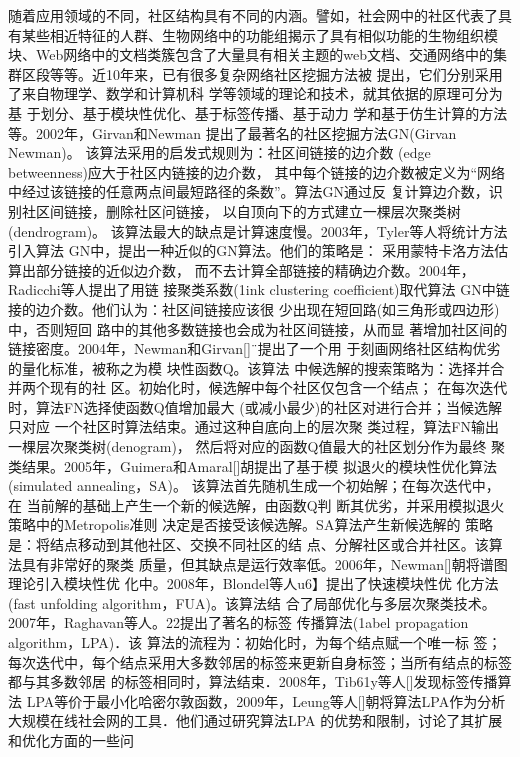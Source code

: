 随着应用领域的不同，社区结构具有不同的内涵。譬如，社会网中的社区代表了具有某些相近特征的人群、生物网络中的功能组揭示了具有相似功能的生物组织模块、Web网络中的文档类簇包含了大量具有相关主题的web文档、交通网络中的集群区段等等。近10年来，已有很多复杂网络社区挖掘方法被
提出，它们分别采用了来自物理学、数学和计算机科
学等领域的理论和技术，就其依据的原理可分为基
于划分、基于模块性优化、基于标签传播、基于动力
学和基于仿生计算的方法等。2002年，Girvan和Newman
提出了最著名的社区挖掘方法GN(Girvan Newman)。
该算法采用的启发式规则为：社区间链接的边介数
(edge betweenness)应大于社区内链接的边介数，
其中每个链接的边介数被定义为“网络中经过该链接的任意两点间最短路径的条数”。算法GN通过反
复计算边介数，识别社区间链接，删除社区问链接，
以自顶向下的方式建立一棵层次聚类树(dendrogram)。
该算法最大的缺点是计算速度慢。2003年，Tyler等人将统计方法引入算法
GN中，提出一种近似的GN算法。他们的策略是：
采用蒙特卡洛方法估算出部分链接的近似边介数，
而不去计算全部链接的精确边介数。2004年，Radicchi等人提出了用链
接聚类系数(1ink clustering coefficient)取代算法
GN中链接的边介数。他们认为：社区间链接应该很
少出现在短回路(如三角形或四边形)中，否则短回
路中的其他多数链接也会成为社区间链接，从而显
著增加社区间的链接密度。2004年，Newman和Girvan[]¨提出了一个用
于刻画网络社区结构优劣的量化标准，被称之为模
块性函数Q。该算法
中候选解的搜索策略为：选择并合并两个现有的社
区。初始化时，候选解中每个社区仅包含一个结点；
在每次迭代时，算法FN选择使函数Q值增加最大
(或减小最少)的社区对进行合并；当候选解只对应
一个社区时算法结束。通过这种自底向上的层次聚
类过程，算法FN输出一棵层次聚类树(denogram)，
然后将对应的函数Q值最大的社区划分作为最终
聚类结果。2005年，Guimera和Amaral[]胡提出了基于模
拟退火的模块性优化算法(simulated annealing，SA)。
该算法首先随机生成一个初始解；在每次迭代中，在
当前解的基础上产生一个新的候选解，由函数Q判
断其优劣，并采用模拟退火策略中的Metropolis准则
决定是否接受该候选解。SA算法产生新候选解的
策略是：将结点移动到其他社区、交换不同社区的结
点、分解社区或合并社区。该算法具有非常好的聚类
质量，但其缺点是运行效率低。2006年，Newman[]朝将谱图理论引入模块性优
化中。2008年，Blondel等人u6】提出了快速模块性优
化方法(fast unfolding algorithm，FUA)。该算法结
合了局部优化与多层次聚类技术。2007年，Raghavan等人。22提出了著名的标签
传播算法(1abel propagation algorithm，LPA)．该
算法的流程为：初始化时，为每个结点赋一个唯一标
签；每次迭代中，每个结点采用大多数邻居的标签来更新自身标签；当所有结点的标签都与其多数邻居
的标签相同时，算法结束．2008年，Tib61y等人[]发现标签传播算法
LPA等价于最小化哈密尔敦函数，2009年，Leung等人[]朝将算法LPA作为分析
大规模在线社会网的工具．他们通过研究算法LPA
的优势和限制，讨论了其扩展和优化方面的一些问
